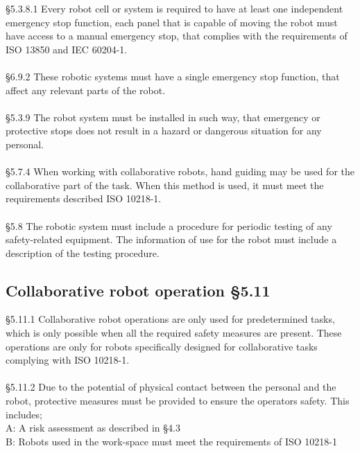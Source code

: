 \S5.3.8.1 Every robot cell or system is required to have at least one independent emergency stop function, each panel that is capable of moving the robot must have access to a manual emergency stop, that complies with the requirements of ISO 13850 and IEC 60204-1.\\ 
\\
\S6.9.2 These robotic systems must have a single emergency stop function, that affect any relevant parts of the robot.\\
\\
\S5.3.9 The robot system must be installed in such way, that emergency or protective stops does not result in a hazard or dangerous situation for any personal.\\
\\
\S5.7.4 When working with collaborative robots, hand guiding may be used for the collaborative part of the task. When this method is used, it must meet the requirements described ISO 10218-1.\\
\\
\S5.8 The robotic system must include a procedure for periodic testing of any safety-related equipment. The information of use for the robot must include a description of the testing procedure. \\

\subsection{Collaborative robot operation \S5.11}

\S5.11.1 Collaborative robot operations are only used for predetermined tasks, which is only possible when all the required safety measures are present. These operations are only for robots specifically designed for collaborative tasks complying with ISO 10218-1. \\
\\
\S5.11.2 Due to the potential of physical contact between the personal and the robot, protective measures must be provided to ensure the operators safety. This includes; \\
A: A risk assessment as described in \S4.3\\
B: Robots used in the work-space must meet the requirements of ISO 10218-1 \\
\cite{ISO10218-2}


